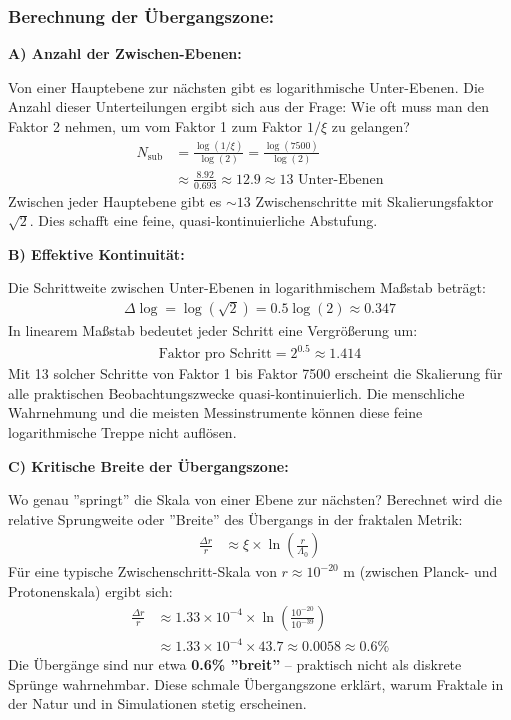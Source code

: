 	\subsubsection*{Berechnung der Übergangszone:}
	
	\textbf{A) Anzahl der Zwischen-Ebenen:}
	
	Von einer Hauptebene zur nächsten gibt es logarithmische Unter-Ebenen. Die Anzahl dieser Unterteilungen ergibt sich aus der Frage: Wie oft muss man den Faktor 2 nehmen, um vom Faktor 1 zum Faktor $1/\xi$ zu gelangen?
	\begin{align*}
		N_{\text{sub}} &= \frac{\log(1/\xi)}{\log(2)} = \frac{\log(7500)}{\log(2)} \\
		&\approx \frac{8.92}{0.693} \approx 12.9 \approx 13 \text{ Unter-Ebenen}
	\end{align*}
	Zwischen jeder Hauptebene gibt es $\sim 13$ Zwischenschritte mit Skalierungsfaktor $\sqrt{2}$. Dies schafft eine feine, quasi-kontinuierliche Abstufung.
	
	\textbf{B) Effektive Kontinuität:}
	
	Die Schrittweite zwischen Unter-Ebenen in logarithmischem Maßstab beträgt:
	\begin{align*}
		\Delta \log = \log(\sqrt{2}) = 0.5 \log(2) \approx 0.347
	\end{align*}
	In linearem Maßstab bedeutet jeder Schritt eine Vergrößerung um:
	\begin{align*}
		\text{Faktor pro Schritt} = 2^{0.5} \approx 1.414
	\end{align*}
	Mit 13 solcher Schritte von Faktor 1 bis Faktor 7500 erscheint die Skalierung für alle praktischen Beobachtungszwecke quasi-kontinuierlich. Die menschliche Wahrnehmung und die meisten Messinstrumente können diese feine logarithmische Treppe nicht auflösen.
	
	\textbf{C) Kritische Breite der Übergangszone:}
	
	Wo genau ''springt'' die Skala von einer Ebene zur nächsten? Berechnet wird die relative Sprungweite oder ''Breite'' des Übergangs in der fraktalen Metrik:
	\begin{align*}
		\frac{\Delta r}{r} &\approx \xi \times \ln\left(\frac{r}{\Lambda_0}\right)
	\end{align*}
	Für eine typische Zwischenschritt-Skala von $r \approx 10^{-20}$ m (zwischen Planck- und Protonenskala) ergibt sich:
	\begin{align*}
		\frac{\Delta r}{r} &\approx 1.33 \times 10^{-4} \times \ln\left(\frac{10^{-20}}{10^{-39}}\right) \\
		&\approx 1.33 \times 10^{-4} \times 43.7 \approx 0.0058 \approx 0.6\%
	\end{align*}
	Die Übergänge sind nur etwa \textbf{0.6\% ''breit''} – praktisch nicht als diskrete Sprünge wahrnehmbar. Diese schmale Übergangszone erklärt, warum Fraktale in der Natur und in Simulationen stetig erscheinen.
	
